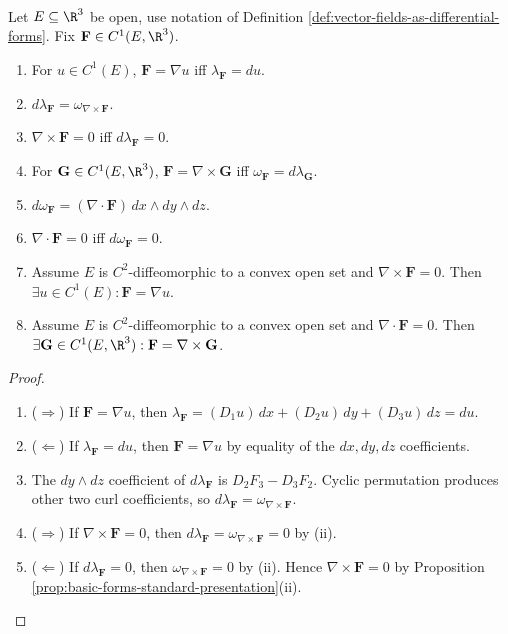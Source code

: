 \begin{theorem} \label{thm:vector-analysis-forms-dictionary} \\
Let $E\subseteq\R^3$ be open, use notation of Definition \ref{def:vector-fields-as-differential-forms}. Fix $\mathbf{F}\in C^1(E,\R^3)$.
\begin{enumerate}[label=(\roman*)]
\setlength{\itemsep}{0pt}
\item For $u\in C^1(E)$, $\mathbf{F}=\nabla u$ iff $\lambda_{\mathbf{F}}=du$.
\item $d\lambda_{\mathbf{F}}=\omega_{\nabla\times\mathbf{F}}$.
\item $\nabla\times\mathbf{F}=0$ iff $d\lambda_{\mathbf{F}}=0$.
\item For $\mathbf{G}\in C^1(E,\R^3)$, $\mathbf{F}=\nabla\times\mathbf{G}$ iff $\omega_{\mathbf{F}}=d\lambda_{\mathbf{G}}$.
\item $d\omega_{\mathbf{F}}=(\nabla\cdot\mathbf{F})\,dx\wedge dy\wedge dz$.
\item $\nabla\cdot\mathbf{F}=0$ iff $d\omega_{\mathbf{F}}=0$.
\item Assume $E$ is $C^2$-diffeomorphic to a convex open set and $\nabla\times\mathbf{F}=0$. Then $\exists u\in C^1(E):\mathbf{F}=\nabla u$.
\item Assume $E$ is $C^2$-diffeomorphic to a convex open set and $\nabla\cdot\mathbf{F}=0$. Then $\exists \mathbf{G}\in C^1(E,\R^3):\mathbf{F}=\nabla\times\mathbf{G}$.
\end{enumerate}
\begin{proof}
\begin{enumerate}[label=(\roman*)]
\setlength{\itemsep}{0pt}
\item[$(i)$] ($\Rightarrow$) If $\mathbf{F}=\nabla u$, then $\lambda_{\mathbf{F}}=(D_1u)\,dx+(D_2u)\,dy+(D_3u)\,dz=du$.
\item[$(i)$] ($\Leftarrow$) If $\lambda_{\mathbf{F}}=du$, then $\mathbf{F}=\nabla u$ by equality of the $dx,dy,dz$ coefficients.
\item[$(ii)$] The $dy\wedge dz$ coefficient of $d\lambda_{\mathbf{F}}$ is $D_2F_3-D_3F_2$. Cyclic permutation produces other two curl coefficients, so $d\lambda_{\mathbf{F}}=\omega_{\nabla\times\mathbf{F}}$.
\item[$(iii)$] ($\Rightarrow$) If $\nabla\times\mathbf{F}=0$, then $d\lambda_{\mathbf{F}}=\omega_{\nabla\times\mathbf{F}}=0$ by (ii).
\item[$(iii)$] ($\Leftarrow$) If $d\lambda_{\mathbf{F}}=0$, then $\omega_{\nabla\times\mathbf{F}}=0$ by (ii). Hence $\nabla\times\mathbf{F}=0$ by Proposition \ref{prop:basic-forms-standard-presentation}(ii).

\end{enumerate}
\end{proof}
\end{theorem}
